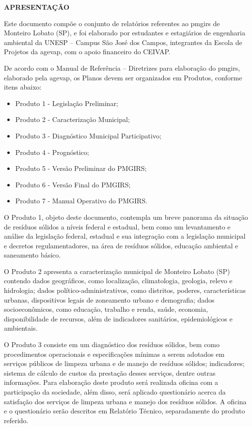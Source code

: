 \begin{center}
    {\bfseries\Large\MakeUppercase{Apresentação}}
\end{center}
Este documento compõe o conjunto de relatórios referentes ao \gls{pmgirs} de Monteiro Lobato (SP), e foi elaborado por estudantes e estagiários de engenharia ambiental da UNESP – Campus São José dos Campos, integrantes da Escola de Projetos da \gls{agevap}, com o apoio financeiro do CEIVAP.

De acordo com o Manual de Referência – Diretrizes para elaboração do \gls{pmgirs}, elaborado pela \gls{agevap}, os Planos devem ser organizados em Produtos, conforme itens abaixo:

\begin{itemize}
    \item {Produto 1 - Legislação Preliminar;}
    \item {Produto 2 - Caracterização Municipal;}
    \item {Produto 3 - Diagnóstico Municipal Participativo;}
    \item Produto 4 - Prognóstico;
    \item Produto 5 - Versão Preliminar do PMGIRS;
    \item Produto 6 - Versão Final do PMGIRS;
    \item Produto 7 - Manual Operativo do PMGIRS.
\end{itemize}

O Produto 1, objeto deste documento, contempla um breve panorama da situação de resíduos sólidos a níveis federal e estadual, bem como um levantamento e análise da legislação federal, estadual e sua integração com a legislação municipal e decretos regulamentadores, na área de resíduos sólidos, educação ambiental e saneamento básico.

O Produto 2 apresenta a caracterização municipal de Monteiro Lobato (SP) contendo dados geográficos, como localização, climatologia, geologia, relevo e hidrologia; dados político-administrativos, como distritos, poderes, características urbanas, dispositivos legais de zoneamento urbano e demografia; dados socioeconômicos, como educação, trabalho e renda, saúde, economia, disponibilidade de recursos, além de indicadores sanitários, epidemiológicos e ambientais.

O Produto 3 consiste em um diagnóstico dos resíduos sólidos, bem como procedimentos operacionais e especificações mínimas a serem adotados em serviços públicos de limpeza urbana e de manejo de resíduos sólidos; indicadores; sistema de cálculo de custos da prestação desses serviços, dentre outras informações. Para elaboração deste produto será realizada oficina com a participação da sociedade, além disso, será aplicado questionário acerca da satisfação dos serviços de limpeza urbana e manejo dos resíduos sólidos. A oficina e o questionário serão descritos em Relatório Técnico, separadamente do produto referido.

